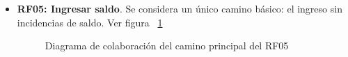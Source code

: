 \begin{itemize}
	\FloatBarrier
	\item \textbf{RF05: Ingresar saldo}. Se considera un único camino básico: el ingreso sin incidencias de saldo. Ver figura ~\ref{fig:diagramaColaboracion_RF05_1}
	\begin{figure}[!htb]
		\centering
		\caption{Diagrama de colaboración del camino principal del RF05}
		\label{fig:diagramaColaboracion_RF05_1}
	\end{figure}
	

\end{itemize}
